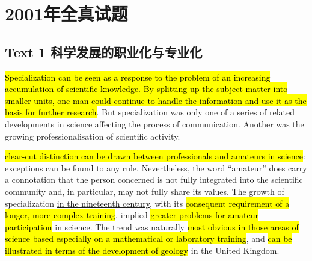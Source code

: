 \section{2001年全真试题}
\subsection{Text 1 科学发展的职业化与专业化}

\hl{Specialization can be seen as a response to the problem of an increasing accumulation of scientific knowledge. By splitting up the subject matter into smaller units, one man could continue to handle the information and use it as the basis for further research}. But specialization was only one of a series of related developments in science affecting the process of communication. Another was the growing professionalisation of scientific activity.

\hl{clear-cut distinction can be drawn between professionals and amateurs in science}: exceptions can be found to any rule. Nevertheless, the word “amateur” does carry a 
connotation that the person concerned is not fully integrated into the scientific community and, in particular, may not fully share its values. 
The growth of specialization \underline{in the nineteenth century}, with its 
\hl{consequent requirement of a longer, more complex training}, 
implied \hl{greater problems for amateur participation} in science. The trend was naturally \hl{most obvious in
those areas of science based especially on a mathematical or laboratory training}, and 
\hl{can be illustrated in terms of the development of geology} in the United Kingdom.

